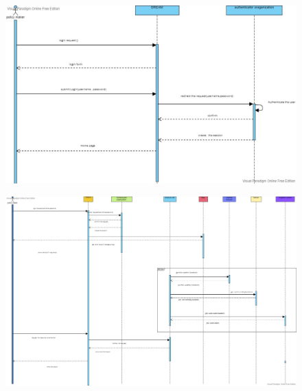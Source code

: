 \begin{figure}[H]
\includegraphics[width=1\textwidth]{figures/thirdSequenceDiagram.jpg}
\end{figure}
\begin{figure}[H]
\includegraphics[width=1\textwidth]{figures/forthSequenceDiagram.jpg}
\end{figure}

